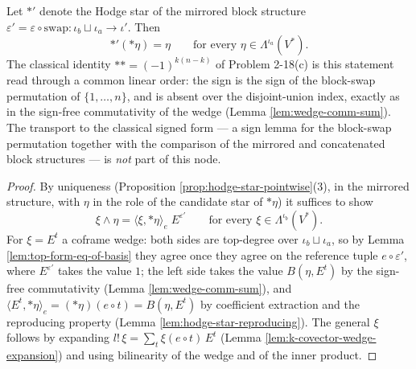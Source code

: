 \begin{proposition}
\label{prop:hodge-star-involution}
\leanok
{}
Let ${*}'$ denote the Hodge star of the mirrored block structure $\varepsilon' = \varepsilon \circ \mathrm{swap} \colon \iota_b \sqcup \iota_a \to \iota'$. Then
\[
{*}'({*}\eta) = \eta \qquad \text{for every } \eta \in \Lambda^{\iota_a}(V^*).
\]
The classical identity ${*}{*} = (-1)^{k(n-k)}$ of Problem 2-18(c) is this statement read through a common linear order: the sign is the sign of the block-swap permutation of $\{1, \ldots, n\}$, and is absent over the disjoint-union index, exactly as in the sign-free commutativity of the wedge (Lemma \ref{lem:wedge-comm-sum}). The transport to the classical signed form --- a sign lemma for the block-swap permutation together with the comparison of the mirrored and concatenated block structures --- is \emph{not} part of this node.
\end{proposition}
\begin{proof}
\leanok
By uniqueness (Proposition \ref{prop:hodge-star-pointwise}(3), in the mirrored structure, with $\eta$ in the role of the candidate star of ${*}\eta$) it suffices to show
\[
\xi \wedge \eta = \langle \xi, {*}\eta \rangle_e\; E^{\varepsilon'} \qquad \text{for every } \xi \in \Lambda^{\iota_b}(V^*).
\]
For $\xi = E^t$ a coframe wedge: both sides are top-degree over $\iota_b \sqcup \iota_a$, so by Lemma \ref{lem:top-form-eq-of-basis} they agree once they agree on the reference tuple $e \circ \varepsilon'$, where $E^{\varepsilon'}$ takes the value $1$; the left side takes the value $B(\eta, E^t)$ by the sign-free commutativity (Lemma \ref{lem:wedge-comm-sum}), and $\langle E^t, {*}\eta \rangle_e = ({*}\eta)(e \circ t) = B(\eta, E^t)$ by coefficient extraction and the reproducing property (Lemma \ref{lem:hodge-star-reproducing}). The general $\xi$ follows by expanding $l!\,\xi = \sum_t \xi(e \circ t)\, E^t$ (Lemma \ref{lem:k-covector-wedge-expansion}) and using bilinearity of the wedge and of the inner product.
\end{proof}

